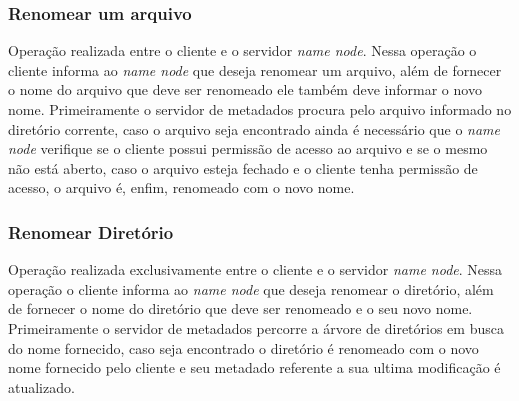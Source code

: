 \subsubsection{Renomear um arquivo}
Operação realizada entre o cliente e o servidor \textit{name node}. Nessa operação o cliente informa ao \textit{name node} que deseja renomear um arquivo, além de fornecer o nome do arquivo que deve ser renomeado ele também deve informar o novo nome. Primeiramente o servidor de metadados procura pelo arquivo informado no diretório corrente, caso o arquivo seja encontrado ainda é necessário que o \textit{name node} verifique se o cliente possui permissão de acesso ao arquivo e se o mesmo não está aberto, caso o arquivo esteja fechado e o cliente tenha permissão de acesso, o arquivo é, enfim, renomeado com o novo nome.
\\

\subsubsection{Renomear Diretório}

Operação realizada exclusivamente entre o cliente e o servidor \textit{name node}. Nessa operação o cliente informa ao \textit{name node} que deseja renomear o diretório, além de fornecer o nome do diretório que deve ser renomeado e o seu novo nome. Primeiramente o servidor de metadados percorre a árvore de diretórios em busca do nome fornecido, caso seja encontrado o diretório é renomeado com o novo nome fornecido pelo cliente e seu metadado referente a sua ultima modificação é atualizado.
\\




